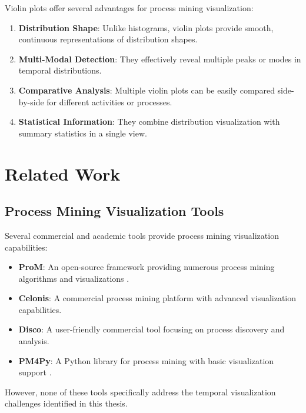 Violin plots offer several advantages for process mining visualization:

\begin{enumerate}
    \item \textbf{Distribution Shape}: Unlike histograms, violin plots provide smooth, continuous representations of distribution shapes.
    
    \item \textbf{Multi-Modal Detection}: They effectively reveal multiple peaks or modes in temporal distributions.
    
    \item \textbf{Comparative Analysis}: Multiple violin plots can be easily compared side-by-side for different activities or processes.
    
    \item \textbf{Statistical Information}: They combine distribution visualization with summary statistics in a single view.
\end{enumerate}

\section{Related Work}
\label{sec:related_work}

\subsection{Process Mining Visualization Tools}
\label{subsec:pm_tools}

Several commercial and academic tools provide process mining visualization capabilities:

\begin{itemize}
    \item \textbf{ProM}: An open-source framework providing numerous process mining algorithms and visualizations \cite{verbeek2010prom}.
    \item \textbf{Celonis}: A commercial process mining platform with advanced visualization capabilities.
    \item \textbf{Disco}: A user-friendly commercial tool focusing on process discovery and analysis.
    \item \textbf{PM4Py}: A Python library for process mining with basic visualization support \cite{berti2019pm4py}.
\end{itemize}

However, none of these tools specifically address the temporal visualization challenges identified in this thesis.


